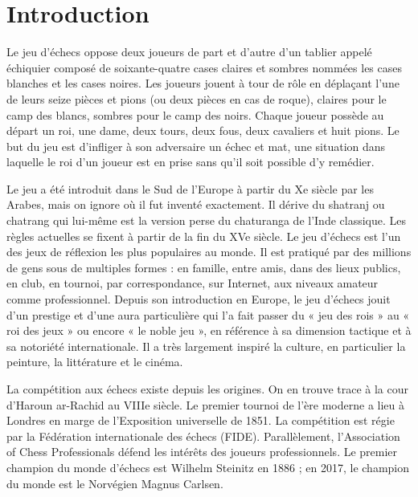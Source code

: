 \documentclass[a5paper,openany,twocolumn]{book}%
\begin{document}
\twocolumn

\onecolumn

\newpage \thispagestyle{empty}
\strut
\newpage \thispagestyle{empty}

\twocolumn

\onecolumn

\chapter{Introduction}\thispagestyle{empty}


Le jeu d’échecs oppose deux joueurs de part et d’autre d’un tablier appelé échiquier composé de soixante-quatre cases claires et sombres nommées les cases blanches et les cases noires. Les joueurs jouent à tour de rôle en déplaçant l'une de leurs seize pièces et pions (ou deux pièces en cas de roque), claires pour le camp des blancs, sombres pour le camp des noirs. Chaque joueur possède au départ un roi, une dame, deux tours, deux fous, deux cavaliers et huit pions. Le but du jeu est d'infliger à son adversaire un échec et mat, une situation dans laquelle le roi d'un joueur est en prise sans qu'il soit possible d'y remédier.

\medskip

Le jeu a été introduit dans le Sud de l'Europe à partir du Xe siècle par les Arabes, mais on ignore où il fut inventé exactement. Il dérive du shatranj ou chatrang qui lui-même est la version perse du chaturanga de l'Inde classique. Les règles actuelles se fixent à partir de la fin du XVe siècle. Le jeu d’échecs est l'un des jeux de réflexion les plus populaires au monde. Il est pratiqué par des millions de gens sous de multiples formes : en famille, entre amis, dans des lieux publics, en club, en tournoi, par correspondance, sur Internet, aux niveaux amateur comme professionnel. Depuis son introduction en Europe, le jeu d'échecs jouit d'un prestige et d'une aura particulière qui l’a fait passer du « jeu des rois » au  « roi des jeux » ou encore « le noble jeu », en référence à sa dimension tactique et à sa notoriété internationale. Il a très largement inspiré la culture, en particulier la peinture, la littérature et le cinéma.

\medskip

La compétition aux échecs existe depuis les origines. On en trouve trace à la cour d'Haroun ar-Rachid au VIIIe siècle. Le premier tournoi de l'ère moderne a lieu à Londres en marge de l'Exposition universelle de 1851. La compétition est régie par la Fédération internationale des échecs (FIDE). Parallèlement, l'Association of Chess Professionals défend les intérêts des joueurs professionnels. Le premier champion du monde d'échecs est Wilhelm Steinitz en 1886 ; en 2017, le champion du monde est le Norvégien Magnus Carlsen.
\end{document}
